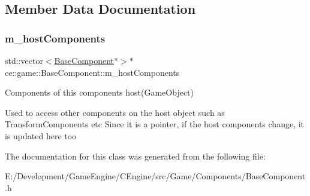 \subsection{Member Data Documentation}
\mbox{\label{classce_1_1game_1_1_base_component_ad0448e0b4026fbfee1f88b63ccfbd19c}} 
\subsubsection{\texorpdfstring{m\+\_\+host\+Components}{m\_hostComponents}}
{\footnotesize\ttfamily std\+::vector$<$\hyperlink{classce_1_1game_1_1_base_component}{Base\+Component}$\ast$$>$$\ast$ ce\+::game\+::\+Base\+Component\+::m\+\_\+host\+Components\hspace{0.3cm}{\ttfamily [protected]}}



Components of this components host(\+Game\+Object) 

Used to access other components on the host object such as Transform\+Components etc Since it is a pointer, if the host components change, it is updated here too 

The documentation for this class was generated from the following file\+:\begin{DoxyCompactItemize}
\item 
E\+:/\+Development/\+Game\+Engine/\+C\+Engine/src/\+Game/\+Components/Base\+Component.\+h\end{DoxyCompactItemize}
